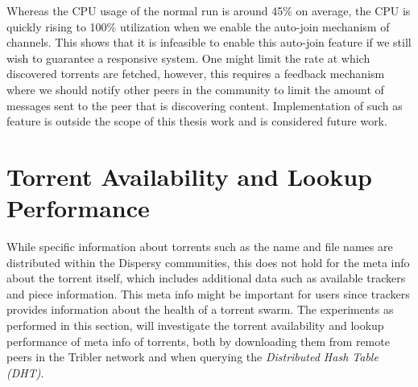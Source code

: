 \noindent Whereas the CPU usage of the normal run is around 45\% on average, the CPU is quickly rising to 100\% utilization when we enable the auto-join mechanism of channels. This shows that it is infeasible to enable this auto-join feature if we still wish to guarantee a responsive system. One might limit the rate at which discovered torrents are fetched, however, this requires a feedback mechanism where we should notify other peers in the community to limit the amount of messages sent to the peer that is discovering content. Implementation of such as feature is outside the scope of this thesis work and is considered future work.

\section{Torrent Availability and Lookup Performance}
While specific information about torrents such as the name and file names are distributed within the Dispersy communities, this does not hold for the meta info about the torrent itself, which includes additional data such as available trackers and piece information. This meta info might be important for users since trackers provides information about the health of a torrent swarm. The experiments as performed in this section, will investigate the torrent availability and lookup performance of meta info of torrents, both by downloading them from remote peers in the Tribler network and when querying the \emph{Distributed Hash Table (DHT)}.

